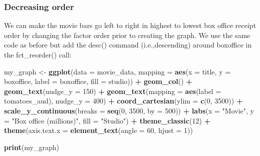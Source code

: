 \documentclass[
]{krantz}
\makeatletter
\newenvironment{Shaded}{\begin{snugshade}}{\end{snugshade}}
\newcommand{\DataTypeTok}[1]{\textcolor[rgb]{0.27,0.27,0.27}{#1}}
\newcommand{\DecValTok}[1]{\textcolor[rgb]{0.06,0.06,0.06}{#1}}
\newcommand{\KeywordTok}[1]{\textcolor[rgb]{0.27,0.27,0.27}{\textbf{#1}}}
\newcommand{\NormalTok}[1]{#1}
\newcommand{\OperatorTok}[1]{\textcolor[rgb]{0.43,0.43,0.43}{\textbf{#1}}}
\newcommand{\StringTok}[1]{\textcolor[rgb]{0.5,0.5,0.5}{#1}}
\newenvironment{kframe}{%
\medskip{}
\setlength{\fboxsep}{.8em}
 \def\at@end@of@kframe{}%
 \ifinner\ifhmode%
  \def\at@end@of@kframe{\end{minipage}}%
  \begin{minipage}{\columnwidth}%
 \fi\fi%
 \def\FrameCommand##1{\hskip\@totalleftmargin \hskip-\fboxsep
 \colorbox{shadecolor}{##1}\hskip-\fboxsep
     \hskip-\linewidth \hskip-\@totalleftmargin \hskip\columnwidth}%
 \MakeFramed {\advance\hsize-\width
   \@totalleftmargin\z@ \linewidth\hsize
   \@setminipage}}%
 {\par\unskip\endMakeFramed%
 \at@end@of@kframe}
\renewenvironment{Shaded}{\begin{kframe}}{\end{kframe}}
\makeatother
\begin{document}
\hypertarget{decreasing-order}{%
\subsubsection{Decreasing order}\label{decreasing-order}}

We can make the movie bars go left to right in highest to lowest box office receipt order by changing the factor order prior to creating the graph. We use the same code as before but add the desc() command (i.e.,descending) around boxoffice in the fct\_reorder() call:

\begin{Shaded}
\end{Shaded}

\begin{Shaded}
\begin{Highlighting}[]
\NormalTok{my_graph <-}\StringTok{ }\KeywordTok{ggplot}\NormalTok{(}\DataTypeTok{data =}\NormalTok{ movie_data,}
           \DataTypeTok{mapping =} \KeywordTok{aes}\NormalTok{(}\DataTypeTok{x =}\NormalTok{ title,}
                         \DataTypeTok{y =}\NormalTok{ boxoffice,}
                         \DataTypeTok{label =}\NormalTok{ boxoffice, }
                         \DataTypeTok{fill =}\NormalTok{ studio)) }\OperatorTok{+}
\StringTok{  }\KeywordTok{geom_col}\NormalTok{() }\OperatorTok{+}
\StringTok{  }\KeywordTok{geom_text}\NormalTok{(}\DataTypeTok{nudge_y =} \DecValTok{150}\NormalTok{)  }\OperatorTok{+}
\StringTok{  }\KeywordTok{geom_text}\NormalTok{(}\DataTypeTok{mapping =} \KeywordTok{aes}\NormalTok{(}\DataTypeTok{label =}\NormalTok{ tomatoes_aud), }
            \DataTypeTok{nudge_y =} \DecValTok{400}\NormalTok{) }\OperatorTok{+}
\StringTok{  }\KeywordTok{coord_cartesian}\NormalTok{(}\DataTypeTok{ylim =} \KeywordTok{c}\NormalTok{(}\DecValTok{0}\NormalTok{, }\DecValTok{3500}\NormalTok{)) }\OperatorTok{+}
\StringTok{  }\KeywordTok{scale_y_continuous}\NormalTok{(}\DataTypeTok{breaks =} \KeywordTok{seq}\NormalTok{(}\DecValTok{0}\NormalTok{, }\DecValTok{3500}\NormalTok{, }\DataTypeTok{by =} \DecValTok{500}\NormalTok{)) }\OperatorTok{+}
\StringTok{  }\KeywordTok{labs}\NormalTok{(}\DataTypeTok{x =} \StringTok{"Movie"}\NormalTok{,}
       \DataTypeTok{y =} \StringTok{"Box office (millions)"}\NormalTok{,}
       \DataTypeTok{fill =} \StringTok{"Studio"}\NormalTok{) }\OperatorTok{+}
\StringTok{  }\KeywordTok{theme_classic}\NormalTok{(}\DecValTok{12}\NormalTok{) }\OperatorTok{+}
\StringTok{  }\KeywordTok{theme}\NormalTok{(}\DataTypeTok{axis.text.x =} \KeywordTok{element_text}\NormalTok{(}\DataTypeTok{angle =} \DecValTok{60}\NormalTok{, }
                                   \DataTypeTok{hjust =} \DecValTok{1}\NormalTok{))  }

\KeywordTok{print}\NormalTok{(my_graph)}
\end{Highlighting}
\end{Shaded}
\end{document}

